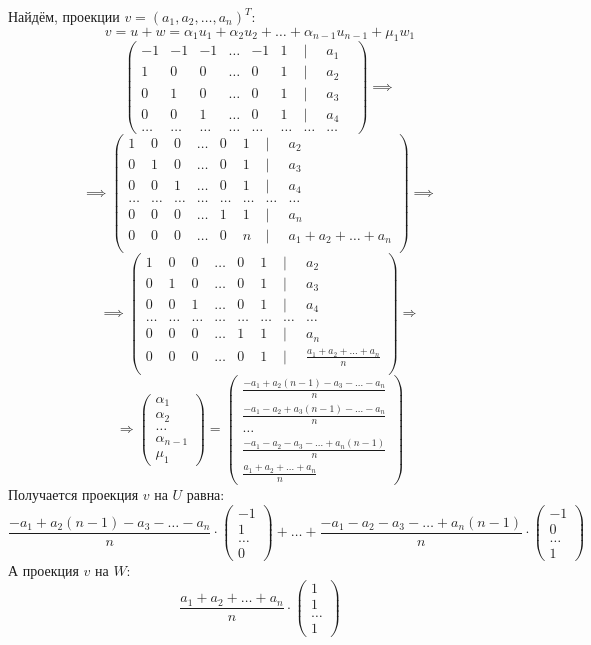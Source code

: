 \documentclass[a4paper]{article}
\newcommand{\mat}[1]{\begin{pmatrix} #1 \end{pmatrix}}
\renewcommand{\f}[2]{\frac{#1}{#2}}
\renewcommand{\r}{\Rightarrow}
\begin{document}
\begin{enumerate}
    Найдём, проекции $v = (a_1, a_2, \dots, a_n)^T$:
    $$v = u + w = \alpha_1u_1 + \alpha_2u_2 + \dots + \alpha_{n-1}u_{n-1} + \mu_1w_1$$
    $$\mat{
        -1 & -1 & -1 & \dots & -1 & 1 & | & a_1\\
         1 & 0 & 0 & \dots & 0 & 1 & | & a_2\\
         0 & 1 & 0 & \dots & 0 & 1 & | & a_3\\
         0 & 0 & 1 & \dots & 0 & 1 & | & a_4 \\
         \dots & \dots &\dots &\dots &\dots & \dots & \dots & \dots &
    } \implies$$$$\implies \mat{
        1 & 0 & 0 & \dots & 0 & 1 & | & a_2\\
        0 & 1 & 0 & \dots & 0 & 1 & | & a_3\\
        0 & 0 & 1 & \dots & 0 & 1 & | & a_4 \\
        \dots & \dots &\dots &\dots &\dots & \dots & \dots & \dots \\
        0 & 0 & 0 & \dots & 1 & 1 & | & a_{n} \\
        0 & 0 & 0 & \dots & 0 & n & | & a_1 + a_2+\dots + a_n\\
    } \implies $$
    $$\implies \mat{
        1 & 0 & 0 & \dots & 0 & 1 & | & a_2\\
        0 & 1 & 0 & \dots & 0 & 1 & | & a_3\\
        0 & 0 & 1 & \dots & 0 & 1 & | & a_4 \\
        \dots & \dots &\dots &\dots &\dots & \dots & \dots & \dots \\
        0 & 0 & 0 & \dots & 1 & 1 & | & a_{n} \\
        0 & 0 & 0 & \dots & 0 & 1 & | & \f{a_1 + a_2+\dots + a_n}{n}\\
    } \r $$
    $$\r \mat{\alpha_1 \\ \alpha_2 \\ \dots \\ \alpha_{n-1}\\ \mu_1} = \mat{\f{-a_1 + a_2(n-1) - a_3 -\dots - a_n}{n} \\ \f{-a_1 - a_2 + a_3(n-1) -\dots - a_n}{n} \\ \dots \\ \f{-a_1 - a_2 - a_3 -\dots + a_n(n-1)}{n} \\ \f{a_1 + a_2+\dots + a_n}{n}}$$
    Получается проекция $v$ на $U$ равна:
    \small{$$\f{-a_1 + a_2(n-1) - a_3 -\dots - a_n}{n} \cdot \mat{-1\\1 \\ \dots \\ 0} + \dots + \f{-a_1 - a_2 - a_3 -\dots + a_n(n-1)}{n} \cdot \mat{-1\\0 \\ \dots \\ 1} $$}
    А проекция $v$ на $W$:
    $$\f{a_1 + a_2+\dots + a_n}{n} \cdot \mat{1\\1\\\dots\\1}$$


\end{enumerate}
\end{document}
